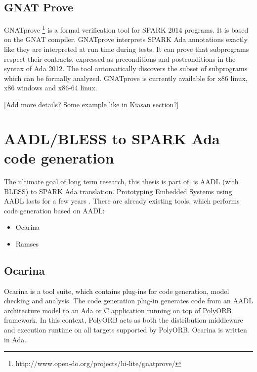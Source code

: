 \subsection{GNAT Prove}
\label{background:spark:gnatprove}

GNATprove \footnote{http://www.open-do.org/projects/hi-lite/gnatprove/} is a formal verification tool for SPARK 2014 programs. It is based on the GNAT compiler. GNATprove interprets SPARK Ada annotations exactly like they are interpreted at run time during tests. It can prove that subprograms respect their contracts, expressed as preconditions and postconditions in the syntax of Ada 2012. The tool automatically discovers the subset of subprograms which can be formally analyzed. GNATprove is currently available for x86 linux, x86 windows and x86-64 linux.

[Add more details? Some example like in Kiasan section?]



\section{AADL/BLESS to SPARK Ada code generation}
\label{background:codegen}

The ultimate goal of long term research, this thesis is part of, is AADL (with BLESS) to SPARK Ada translation. Prototyping Embedded Systems using AADL lasts for a few years \cite{PrototypyingAadl:Paper}. There are already existing tools, which performs code generation based on AADL:
\begin{itemize}
	\item Ocarina
	\item Ramses
\end{itemize}


\subsection{Ocarina}
\label{background:codegen:ocarina}


Ocarina \cite{Ocarina:Paper} is a tool suite, which contains plug-ins for code generation, model checking and analysis. The code generation plug-in generates code from an AADL architecture model to an Ada or C application running on top of PolyORB framework. In this context, PolyORB acts as both the distribution middleware and execution runtime on all targets supported by PolyORB. Ocarina is written in Ada.

